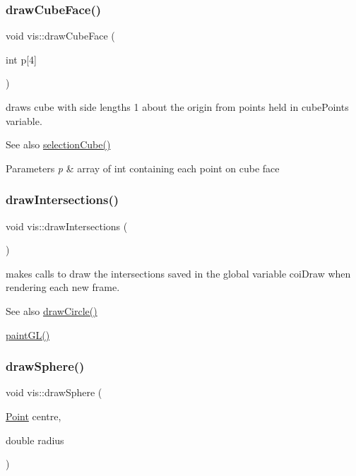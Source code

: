 \subsubsection{\texorpdfstring{draw\+Cube\+Face()}{drawCubeFace()}}
{\footnotesize\ttfamily void vis\+::draw\+Cube\+Face (\begin{DoxyParamCaption}\item[{int}]{p\mbox{[}4\mbox{]} }\end{DoxyParamCaption})}

draws cube with side lengths 1 about the origin from points held in cube\+Points variable.

\begin{DoxySeeAlso}{See also}
\mbox{\hyperlink{classvis_a86ece524e0bee2bf1c7741169f4d2ee9}{selection\+Cube()}} 
\end{DoxySeeAlso}

\begin{DoxyParams}{Parameters}
{\em p} & array of int containing each point on cube face \\
\hline
\end{DoxyParams}
\mbox{\label{classvis_aca1eb70cb49a572f7d34916aec3d95da}} 
\subsubsection{\texorpdfstring{draw\+Intersections()}{drawIntersections()}}
{\footnotesize\ttfamily void vis\+::draw\+Intersections (\begin{DoxyParamCaption}{ }\end{DoxyParamCaption})}

makes calls to draw the intersections saved in the global variable coi\+Draw when rendering each new frame.

\begin{DoxySeeAlso}{See also}
\mbox{\hyperlink{classvis_a1b2fbed076352ace06cf7cbec8146be3}{draw\+Circle()}} 

\mbox{\hyperlink{classvis_ace835462bb98cad495e829c08e1a26ea}{paint\+G\+L()}} 
\end{DoxySeeAlso}
\mbox{\label{classvis_a462f90942b36607561139dbcf4e6dabb}} 
\subsubsection{\texorpdfstring{draw\+Sphere()}{drawSphere()}}
{\footnotesize\ttfamily void vis\+::draw\+Sphere (\begin{DoxyParamCaption}\item[{\mbox{\hyperlink{struct_point}{Point}}}]{centre,  }\item[{double}]{radius }\end{DoxyParamCaption})}

